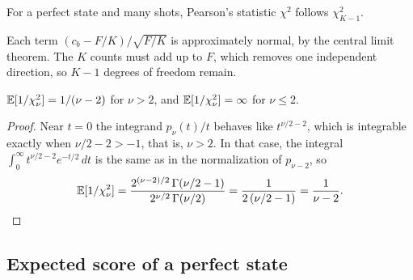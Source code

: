 \documentclass[11pt]{scrartcl}
\begin{document}
\begin{fact}
  For a perfect state and many shots, Pearson's statistic $\chi^2$ follows $\chi^2_{K-1}$.
\end{fact}

Each term $(c_b-F/K)/\sqrt{F/K}$ is approximately normal, by the central limit theorem. The $K$
counts must add up to $F$, which removes one independent direction, so $K-1$ degrees of freedom
remain.

\begin{lemma}\label{lem:inv}
  $\mathbb E[1/\chi^2_\nu]=1/(\nu-2)$ for $\nu>2$, and $\mathbb E[1/\chi^2_\nu]=\infty$ for $\nu\le2$.
\end{lemma}
\begin{proof}
  Near $t=0$ the integrand $p_\nu(t)/t$ behaves like $t^{\nu/2-2}$, which is integrable exactly when
  $\nu/2-2>-1$, that is, $\nu>2$. In that case, the integral $\int_0^\infty t^{\nu/2-2}e^{-t/2}\,dt$
  is the same as in the normalization of $p_{\nu-2}$, so
  \[
    \mathbb E[1/\chi^2_\nu]=\frac{2^{(\nu-2)/2}\,\Gamma(\nu/2-1)}{2^{\nu/2}\,\Gamma(\nu/2)}
    =\frac{1}{2\,(\nu/2-1)}=\frac{1}{\nu-2}.\qedhere
  \]
\end{proof}

\subsection{Expected score of a perfect state}
\end{document}
